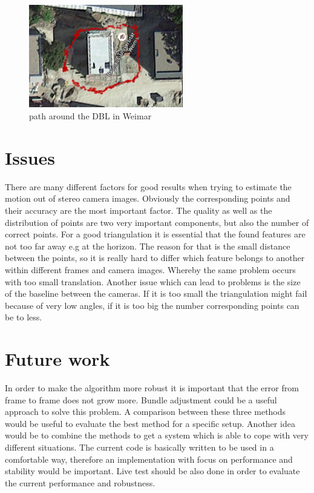\documentclass[11pt]{article}
\begin{document}
	\begin{figure}[H]
		\centering
		\includegraphics[width=0.6\textwidth]{images/result.jpg}
		\caption{path around the DBL in Weimar}
	\end{figure}

	\section{Issues}

	There are many different factors for good results when trying to estimate the motion out of stereo camera images. Obviously the corresponding points and their accuracy are the most important factor. The quality as well as the distribution of points are two very important components, but also the number of correct points. For a good triangulation it is essential that the found features are not too far away e.g at the horizon. The reason for that is the small distance between the points, so it is really hard to differ which feature belongs to another within different frames and camera images. Whereby the same problem occurs with too small translation. Another issue which can lead to problems is the size of the baseline between the cameras. If it is too small the triangulation might fail because of very low angles, if it is too big the number corresponding points can be to less.
	
	
	\section{Future work}
	In order to make the algorithm more robust it is important that the error from frame to frame does not grow more. Bundle adjustment could be a useful approach to solve this problem. A comparison between these three methods would be useful to evaluate the best method for a specific setup. Another idea would be to combine the methods to get a system which is able to cope with very different situations. The current code is basically written to be used in a comfortable way, therefore an implementation with focus on performance and stability would be important. Live test should be also done in order to evaluate the current performance and robustness.

	\newpage
	
\end{document}
